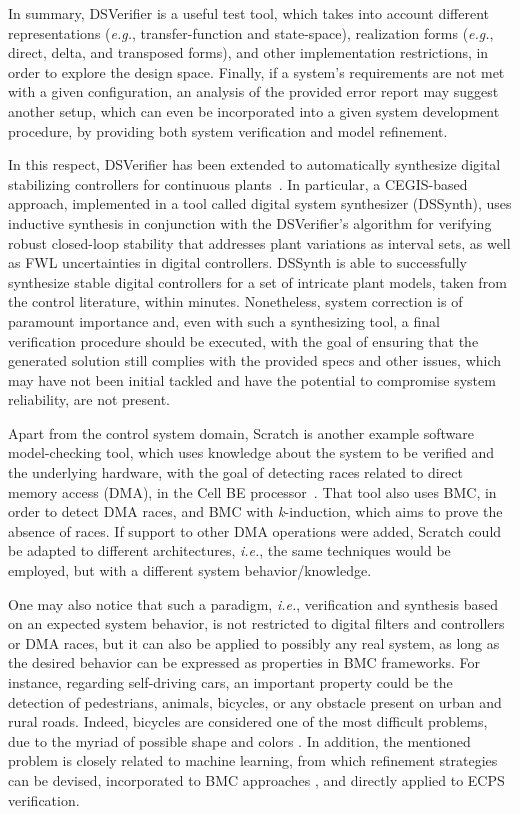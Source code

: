 \documentclass[format=acmsmall, review=false, screen=true]{acmart}
\begin{document}
In summary, DSVerifier is a useful test tool, which takes into account different representations ({\it e.g.}, transfer-function and state-space), realization forms ({\it e.g.}, direct, delta, and transposed forms), and other implementation restrictions, in order to explore the design space. Finally, if a system's requirements are not met with a given configuration, an analysis of the provided error report may suggest another setup, which can even be incorporated into a given system development procedure, by providing both system verification and model refinement. 

In this respect, DSVerifier has been extended to automatically synthesize digital stabilizing controllers for continuous plants~\cite{Abate17}. In particular, a CEGIS-based approach, implemented in a tool called digital system synthesizer (DSSynth), uses inductive synthesis in conjunction with the DSVerifier's algorithm for verifying robust closed-loop stability that addresses plant variations as interval sets, as well as FWL uncertainties in digital controllers. DSSynth is able to successfully synthesize stable digital controllers for a set of intricate plant models, taken from the control literature, within minutes. Nonetheless, system correction is of paramount importance and, even with such a synthesizing tool, a final verification procedure should be executed, with the goal of ensuring that the generated solution still complies with the provided specs and other issues, which may have not been initial tackled and have the potential to compromise system reliability, are not present.

Apart from the control system domain, Scratch is another example software model-checking tool, which uses knowledge about the system to be verified and the underlying hardware, with the goal of detecting races related to direct memory access (DMA), in the Cell BE processor~\cite{Donaldson10}. That tool also uses BMC, in order to detect DMA races, and BMC with \textit{k}-induction, which aims to prove the absence of races. If support to other DMA operations were added, Scratch could be adapted to different architectures, {\it i.e.}, the same techniques would be employed, but with a different system behavior/knowledge.

One may also notice that such a paradigm, {\it i.e.}, verification and synthesis based on an expected system behavior, is not restricted to digital filters and controllers or DMA races, but it can also be applied to possibly any real system, as long as the desired behavior can be expressed as properties in BMC frameworks. For instance, regarding self-driving cars, an important property could be the detection of pedestrians, animals, bicycles, or any obstacle present on urban and rural roads. Indeed, bicycles are considered one of the most difficult problems, due to the myriad of possible shape and colors \cite{selfcar}. In addition, the mentioned problem is closely related to machine learning, from which refinement strategies can be devised, incorporated to BMC approaches \cite{BMCml}, and directly applied to ECPS verification.
\end{document}
